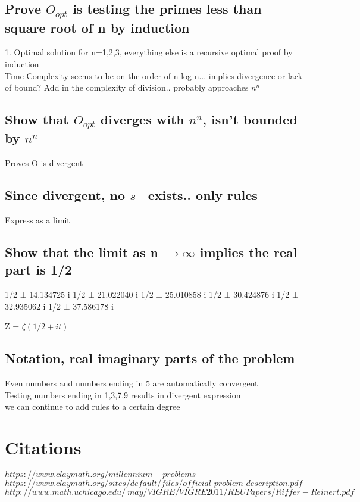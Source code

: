 \documentclass[11pt]{article}
\begin{document}
\subsection{Prove $O_{opt}$ is testing the primes less than square root of n by induction}
1. Optimal solution for n=1,2,3, everything else is a recursive optimal proof by induction\\
Time Complexity seems to be on the order of n log n... implies divergence or lack of bound? Add in the complexity of division.. probably approaches $n^n$

\subsection{Show that $O_{opt}$ diverges with $n^n$, isn't bounded by $n^n$}
Proves O is divergent

\subsection{Since divergent, no $s^{+}$ exists.. only rules}
Express as a limit

\subsection{Show that the limit as n $\rightarrow \infty$ implies the real part is 1/2}
1/2 ± 14.134725 i
1/2 ± 21.022040 i
1/2 ± 25.010858 i
1/2 ± 30.424876 i
1/2 ± 32.935062 i
1/2 ± 37.586178 i

Z = $\zeta(1/2 + it)$

\subsection{Notation, real imaginary parts of the problem}
Even numbers and numbers ending in 5 are automatically convergent\\
Testing numbers ending in 1,3,7,9 results in divergent expression\\
we can continue to add rules to a certain degree


\newpage
\section*{Citations}
\rbrack \hspace{1mm} $ https://www.claymath.org/millennium-problems$\\
\rbrack \hspace{1mm} $ https://www.claymath.org/sites/default/files/official\_problem\_description.pdf$
 \rbrack \hspace{1mm} $http://www.math.uchicago.edu/~may/VIGRE/VIGRE2011/REUPapers/Riffer-Reinert.pdf$
\end{document}
